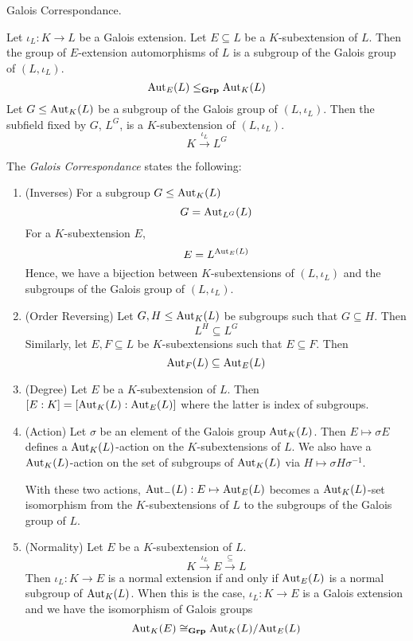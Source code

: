 \documentclass[../book.tex]{subfiles}
\begin{document}
\begin{thm} Galois Correspondance. 
    
    Let $\iota_L : K \to L$ be a Galois extension.
    Let $E \subseteq L$ be a $K$-subextension of $L$. 
    Then the group of $E$-extension automorphisms of $L$ is
    a subgroup of the Galois group of $(L,\iota_L)$. \[
        \text{Aut}_{E}(L) \leq_{\mathbf{Grp}} \text{Aut}_{K}(L)
    \]
    Let $G \leq \text{Aut}_{K}(L)$ be a subgroup of the Galois group of $(L,\iota_L)$. 
    Then the subfield fixed by $G$, $L^G$, is a $K$-subextension of $(L,\iota_L)$.
    \[ K \overset{\iota_L}{\to} L^G \]
    
    The \emph{Galois Correspondance} states the following: 
    \begin{enumerate}
        \item (Inverses)
            For a subgroup $G \leq \text{Aut}_{K}(L)$ \[
                G = \text{Aut}_{L^G}(L)
            \]
            For a $K$-subextension $E$, \[
                E = L^{\text{Aut}_{E}(L)}
            \]
            Hence, we have a bijection between $K$-subextensions of $(L,\iota_L)$
            and the subgroups of the Galois group of $(L,\iota_L)$.
        \item (Order Reversing) 
            Let $G, H \leq \text{Aut}_{K}(L)$ be subgroups such that $G \subseteq H$.
            Then \[ L^H \subseteq L^G \]
            Similarly, 
            let $E, F \subseteq L$ be $K$-subextensions such that $E \subseteq F$.
            Then \[ \text{Aut}_{F}(L) \subseteq \text{Aut}_{E}(L) \]
        \item (Degree) 
            Let $E$ be a $K$-subextension of $L$. 
            Then $[E : K] = [\text{Aut}_{K}(L) : \text{Aut}_{E}(L)]$
            where the latter is index of subgroups. 
        \item (Action)
            Let $\sigma$ be an element of the Galois group $\text{Aut}_{K}(L)$.
            Then $E \mapsto \sigma E$ defines a $\text{Aut}_{K}(L)$-action
            on the $K$-subextensions of $L$. 
            We also have a $\text{Aut}_{K}(L)$-action 
            on the set of subgroups of $\text{Aut}_{K}(L)$ via 
            $H \mapsto \sigma H \sigma^{-1}$.
            
            With these two actions, $\text{Aut}_{-}(L) : E \mapsto \text{Aut}_{E}(L)$
            becomes a $\text{Aut}_{K}(L)$-set isomorphism from the $K$-subextensions of $L$
            to the subgroups of the Galois group of $L$. 
        \item (Normality)
            Let $E$ be a $K$-subextension of $L$. \[
                K \overset{\iota_L}{\to} E \overset{\subseteq}{\to} L
            \]
            Then $\iota_L : K \to E$ is a normal extension if and only if
            $\text{Aut}_{E}(L)$ is a normal subgroup of $\text{Aut}_{K}(L)$. 
            When this is the case, $\iota_L : K \to E$ is a Galois extension
            and we have the isomorphism of Galois groups \[
                \text{Aut}_{K}(E) \cong_{\mathbf{Grp}} \text{Aut}_{K}(L) / \text{Aut}_{E}(L)
            \]
    \end{enumerate}
\end{thm}
\end{document}
